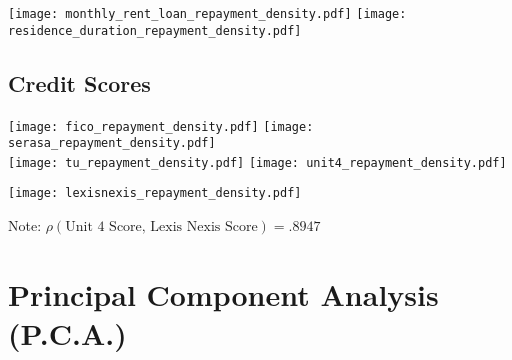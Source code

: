 \documentclass[a4paper, landscape]{article}
\begin{document}
\vspace{40mm}

\begin{center}
\texttt{[image: monthly\_rent\_loan\_repayment\_density.pdf]}
\texttt{[image: residence\_duration\_repayment\_density.pdf]}
\end{center}

\newpage
\subsection{Credit Scores}
\texttt{[image: fico\_repayment\_density.pdf]}
\texttt{[image: serasa\_repayment\_density.pdf]} \\
\texttt{[image: tu\_repayment\_density.pdf]}
\texttt{[image: unit4\_repayment\_density.pdf]}

\newpage

\begin{center}
\texttt{[image: lexisnexis\_repayment\_density.pdf]}
\end{center}

\begin{center}
Note: $ \rho( \text{Unit 4 Score, Lexis Nexis Score}) = .8947$
\end{center}

\newpage



\newpage
\section{Principal Component Analysis (P.C.A.)}
\end{document}

